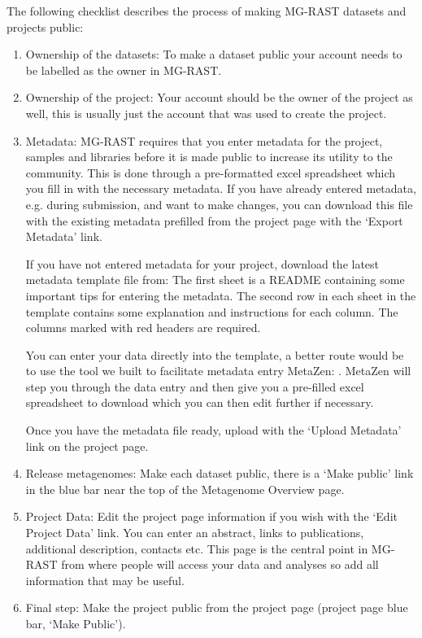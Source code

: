\documentclass[letterpaper,10pt,english]{sphinxmanual}
\begin{document}
The following checklist describes the process of making MG-RAST datasets
and projects public:
\begin{enumerate}
\def\theenumi{\arabic{enumi}}
\def\labelenumi{\theenumi .}
\makeatletter\def\p@enumii{\p@enumi \theenumi .}\makeatother
\item {} 
Ownership of the datasets: To make a dataset public your account
needs to be labelled as the owner in MG-RAST.

\item {} 
Ownership of the project: Your account should be the owner of the
project as well, this is usually just the account that was used to
create the project.

\item {} 
Metadata: MG-RAST requires that you enter metadata for the project,
samples and libraries before it is made public to increase its
utility to the community. This is done through a pre-formatted excel
spreadsheet which you fill in with the necessary metadata. If you
have already entered metadata, e.g. during submission, and want to
make changes, you can download this file with the existing metadata
prefilled from the project page with the ‘Export Metadata’ link.

If you have not entered metadata for your project, download the
latest metadata template file from:
 The first sheet is a README
containing some important tips for entering the metadata. The second
row in each sheet in the template contains some explanation and
instructions for each column. The columns marked with red headers are
required.

You can enter your data directly into the template, a better route
would be to use the tool we built to facilitate metadata entry \textendash{}
MetaZen: . MetaZen will step you
through the data entry and then give you a pre-filled excel
spreadsheet to download which you can then edit further if necessary.

Once you have the metadata file ready, upload with the ‘Upload
Metadata’ link on the project page.

\item {} 
Release metagenomes: Make each dataset public, there is a ‘Make
public’ link in the blue bar near the top of the Metagenome Overview
page.

\item {} 
Project Data: Edit the project page information if you wish with the
‘Edit Project Data’ link. You can enter an abstract, links to
publications, additional description, contacts etc. This page is the
central point in MG-RAST from where people will access your data and
analyses so add all information that may be useful.

\item {} 
Final step: Make the project public from the project page (project
page blue bar, ‘Make Public’).

\end{enumerate}
\end{document}
